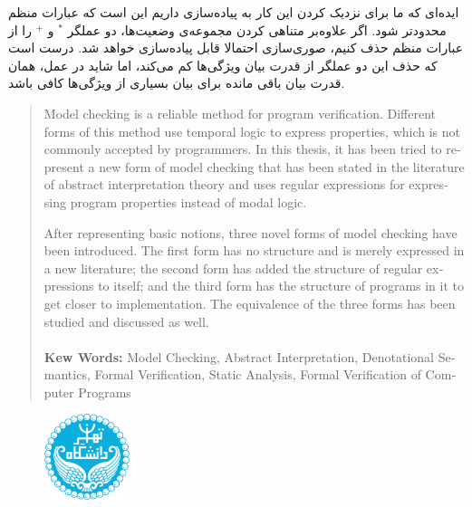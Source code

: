 \documentclass[12pt]{report}
\begin{document}
ایده‌ای که ما برای نزدیک کردن این کار به پیاده‌سازی داریم این است که عبارات منظم محدود‌تر شود. اگر علاوه‌بر متناهی کردن مجموعه‌ی وضعیت‌ها، دو عملگر $^*$ و $^+$ را از عبارات منظم حذف کنیم، صوری‌سازی احتمالا قابل پیاده‌سازی خواهد شد. درست است که حذف این دو عملگر از قدرت بیان ویژگی‌ها کم می‌کند، اما شاید در عمل، همان قدرت بیان باقی مانده برای بیان بسیاری از ویژگی‌ها کافی باشد.

\printglossary


\newpage
\begin{latin}
	
	
\end{latin}

\begin{latin}
\begin{abstract}



Model checking is a reliable method for program verification. Different forms of this method use temporal logic to express properties, which is not commonly accepted by programmers. In this thesis, it has been tried to represent a new form of model checking that has been stated in the literature of abstract interpretation theory and uses regular expressions for expressing program properties instead of modal logic.

After representing basic notions, three novel forms of model checking have been introduced. The first form has no structure and is merely expressed in a new literature; the second form has added the structure of regular expressions to itself; and the third form has the structure of programs in it to get closer to implementation.
The equivalence of the three forms has been studied and discussed as well. \\\\

\textbf{Kew Words:}
Model Checking, Abstract Interpretation, Denotational Semantics, Formal Verification, Static Analysis, Formal Verification of Computer Programs



\end{abstract}
\newpage

\begin{figure}
\centering
\includegraphics[height=2.5cm]{UT-Logo.png}
\end{figure}
\begin{center}


\end{center}
\end{latin}
\end{document}

